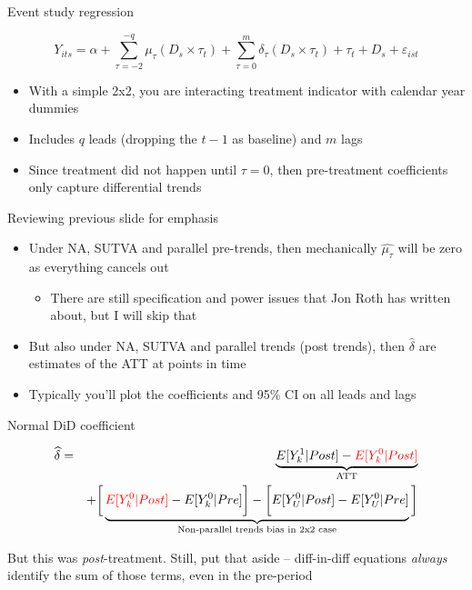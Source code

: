 \documentclass{beamer}
\begin{document}
\begin{frame}{Event study regression}

 $$Y_{its} = \alpha + \sum_{\tau=-2}^{-q}\mu_{\tau} (D_s \times \tau_t) + \sum_{\tau=0}^m\delta_{\tau} (D_s \times \tau_t) + \tau_t + D_s + \varepsilon_{ist}$$
		\begin{itemize}
		\item With a simple 2x2, you are interacting treatment indicator with calendar year dummies
		\item Includes $q$ leads (dropping the $t-1$ as baseline) and $m$ lags
		\item Since treatment did not happen until $\tau=0$, then pre-treatment coefficients only capture differential trends
		\end{itemize}
\end{frame}

\begin{frame}{Reviewing previous slide for emphasis}


\begin{itemize}
\item Under NA, SUTVA and parallel pre-trends, then mechanically $\widehat{\mu_{\tau}}$ will be zero as everything cancels out
	\begin{itemize}
\item There are still specification and power issues that Jon Roth has written about, but I will skip that
	\end{itemize}
\item But also under NA, SUTVA and parallel trends (post trends), then $\widehat{\delta}$ are estimates of the ATT at points in time
\item  Typically you'll plot the coefficients and 95\% CI on all leads and lags
\end{itemize}

\end{frame}

\begin{frame}{Normal DiD coefficient}

\begin{eqnarray*}
\widehat{\delta} &=& \underbrace{E[Y^1_k | Post] - \textcolor{red}{E[Y^0_k | Post]}}_{\mathclap{\text{ATT}}} \\
&& + \bigg [  \underbrace{\textcolor{red}{E[Y^0_k | Post]} - E[Y^0_k | Pre] \bigg ] - \bigg [ E[Y^0_U | Post] - E[Y_U^0 | Pre] }_{\mathclap{\text{Non-parallel trends bias in 2x2 case}}} \bigg ]
\end{eqnarray*}

\bigskip

But this was \emph{post}-treatment.  Still, put that aside -- diff-in-diff equations \emph{always} identify the sum of those terms, even in the pre-period


\end{frame}
\end{document}
